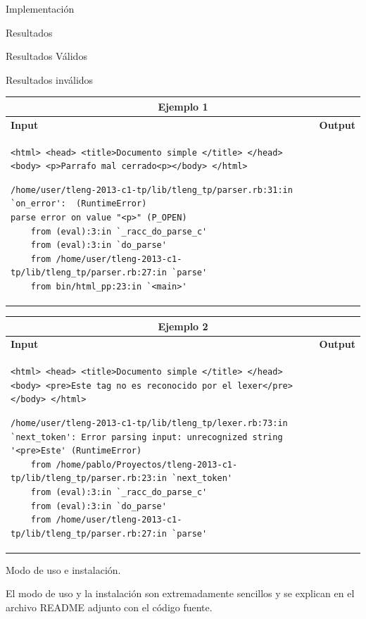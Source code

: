 \documentclass[a4paper,8pt]{article}
\begin{document}
\begin{section}{Implementación}
\begin{subsection}{Resultados}
\begin{subsubsection}{Resultados Válidos}
\end{subsubsection}


\begin{subsubsection}{Resultados inválidos}
\begin{tabular}{|p{6.5cm}|p{6.5cm}|}
\hline 
\multicolumn{2}{|c|}{Ejemplo 1}\\
\hline 
\textbf{Input}&\textbf{Output}\\
\hline 
\footnotesize{\begin{verbatim}
<html> <head> <title>Documento simple </title> </head><body> <p>Parrafo mal cerrado<p></body> </html>
\end{verbatim}}

\bigskip
\footnotesize{\begin{verbatim}
/home/user/tleng-2013-c1-tp/lib/tleng_tp/parser.rb:31:in `on_error':  (RuntimeError)
parse error on value "<p>" (P_OPEN)
	from (eval):3:in `_racc_do_parse_c'
	from (eval):3:in `do_parse'
	from /home/user/tleng-2013-c1-tp/lib/tleng_tp/parser.rb:27:in `parse'
	from bin/html_pp:23:in `<main>'
\end{verbatim}}\\
\hline

\end{tabular}


\begin{tabular}{|p{6.5cm}|p{6.5cm}|}
\hline 
\multicolumn{2}{|c|}{Ejemplo 2}\\
\hline 
\textbf{Input}&\textbf{Output}\\
\hline 
\footnotesize{\begin{verbatim}
<html> <head> <title>Documento simple </title> </head><body> <pre>Este tag no es reconocido por el lexer</pre> </body> </html>
\end{verbatim}}

\bigskip
\footnotesize{\begin{verbatim}
/home/user/tleng-2013-c1-tp/lib/tleng_tp/lexer.rb:73:in `next_token': Error parsing input: unrecognized string '<pre>Este' (RuntimeError)
	from /home/pablo/Proyectos/tleng-2013-c1-tp/lib/tleng_tp/parser.rb:23:in `next_token'
	from (eval):3:in `_racc_do_parse_c'
	from (eval):3:in `do_parse'
	from /home/user/tleng-2013-c1-tp/lib/tleng_tp/parser.rb:27:in `parse'
\end{verbatim}}\\
\hline

\end{tabular}

\end{subsubsection}
\end{subsection}


\begin{subsection}{Modo de uso e instalación.}

El modo de uso y la instalación son extremadamente sencillos y se explican en el archivo README adjunto con el código fuente.

\end{subsection}
\end{section}
\end{document}

